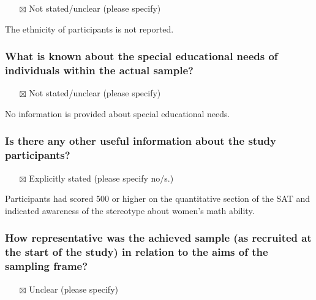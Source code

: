 \documentclass[
  doc, a4paper]{apa7}
\providecommand{\tightlist}{%
  \setlength{\itemsep}{0pt}\setlength{\parskip}{0pt}}
\begin{document}
\begin{itemize}
\tightlist
\item[$\boxtimes$]
  Not stated/unclear (please specify)
\end{itemize}

The ethnicity of participants is not reported.

\subsubsection{What is known about the special educational needs of individuals within the actual sample?}\label{what-is-known-about-the-special-educational-needs-of-individuals-within-the-actual-sample}

\begin{itemize}
\tightlist
\item[$\boxtimes$]
  Not stated/unclear (please specify)
\end{itemize}

No information is provided about special educational needs.

\subsubsection{Is there any other useful information about the study participants?}\label{is-there-any-other-useful-information-about-the-study-participants}

\begin{itemize}
\tightlist
\item[$\boxtimes$]
  Explicitly stated (please specify no/s.)
\end{itemize}

Participants had scored 500 or higher on the quantitative section of the SAT and indicated awareness of the stereotype about women's math ability.

\subsubsection{How representative was the achieved sample (as recruited at the start of the study) in relation to the aims of the sampling frame?}\label{how-representative-was-the-achieved-sample-as-recruited-at-the-start-of-the-study-in-relation-to-the-aims-of-the-sampling-frame}

\begin{itemize}
\tightlist
\item[$\boxtimes$]
  Unclear (please specify)
\end{itemize}
\end{document}
